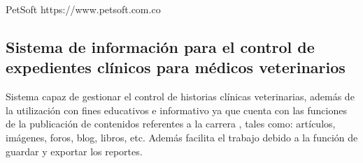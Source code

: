 PetSoft
https://www.petsoft.com.co

\subsection{Sistema de información para el control de expedientes clínicos para médicos veterinarios}

Sistema capaz de gestionar el control de historias 
clínicas veterinarias, además de la utilización con fines educativos e informativo ya que 
cuenta con las funciones de la publicación de contenidos referentes a la carrera , tales 
como: artículos, imágenes, foros, blog, libros, etc. Además facilita el trabajo debido a la 
función de guardar y exportar los reportes.


